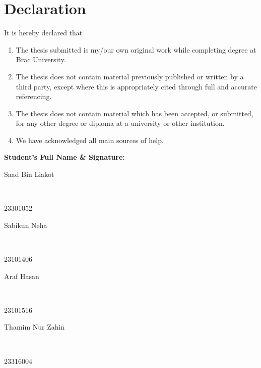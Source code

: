 \newcommand*\wildcard[2][6cm]{\vspace{2cm}\parbox{#1}{\hrulefill\par#2}} 


\section*{Declaration}

It is hereby declared that

\begin{enumerate} %
  \item The thesis submitted is my/our own original work while completing degree at Brac University.
  \item The thesis does not contain material previously published or written by a third party, except where this is appropriately cited through full and accurate referencing.
  \item The thesis does not contain material which has been accepted, or submitted, for any other degree or diploma at a university or other institution.
  \item We have acknowledged all main sources of help.
\end{enumerate}

\vspace{1cm}
\textbf{Student’s Full Name \& Signature:} %

\begingroup

    \begin{center}
        \wildcard{\centerline{Saad Bin Liakot} ~\\ \centerline{23301052}} %
        \hspace{2cm} %
        \wildcard{\centerline{Sabikun Neha} ~\\ \centerline{23101406} }
        \wildcard{\centerline{Araf Hasan} ~\\ \centerline{23101516} }
        \hspace{2cm}
        \wildcard{\centerline{Thamim Nur Zahin} ~\\ \centerline{23316004} }
    \end{center}

\endgroup


\pagebreak






